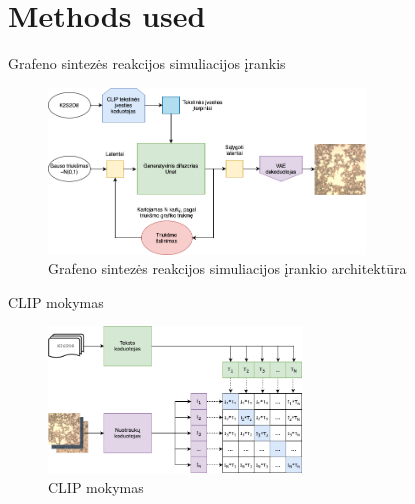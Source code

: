 \section{Methods used}

\begin{frame}[c]{Grafeno sintezės reakcijos simuliacijos įrankis}
    \begin{figure}
        \centering
        \includegraphics[width=0.75\textwidth]{img/text2image_grafenas_gulscias.png}
        \caption{Grafeno sintezės reakcijos simuliacijos įrankio architektūra \cite{LatentDiffusion}}
        \label{fig:text2image_pipeline}
    \end{figure}
\end{frame}

\begin{frame}[c]{CLIP mokymas}
    \begin{figure}
        \centering
        \includegraphics[width=0.6\textwidth]{img/CLIP_training_lt.png}
        \caption{CLIP mokymas}
        \label{fig:clip_training}
    \end{figure}
    \begin{center}
        {\tiny \cite{CLIP}}
    \end{center}
\end{frame}


